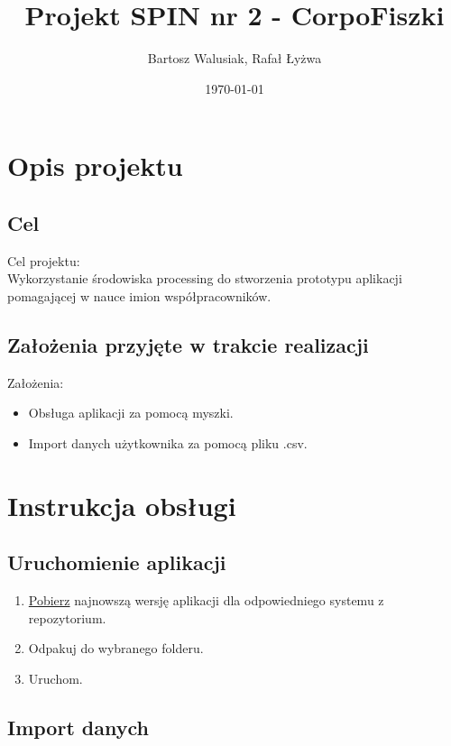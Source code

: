 \documentclass[11pt]{article}
\begin{document}
    \title{Projekt SPIN nr 2 - CorpoFiszki}
    \author{Bartosz Walusiak, Rafał Łyżwa}
    \date{\today}
    \maketitle

    \tableofcontents

    \newpage

    \section{Opis projektu}\label{sec:description}
    \subsection{Cel}\label{subsec:target}
    Cel projektu:\\
    Wykorzystanie środowiska processing do stworzenia prototypu aplikacji pomagającej w nauce imion współpracowników.

    \subsection{Założenia przyjęte w trakcie realizacji}\label{subsec:design-choices}
    Założenia:
    \begin{itemize}
        \item Obsługa aplikacji za pomocą myszki.
        \item Import danych użytkownika za pomocą pliku .csv.
    \end{itemize}

    \newpage

    \section{Instrukcja obsługi}\label{sec:user-manual}

    \subsection{Uruchomienie aplikacji}\label{subsec:setup}

    \begin{enumerate}
        \item \href{https://github.com/BWalusiak/flashcards/releases}{Pobierz} najnowszą wersję aplikacji dla odpowiedniego systemu z repozytorium.
        \item Odpakuj do wybranego folderu.
        \item Uruchom.
    \end{enumerate}

    \subsection{Import danych}\label{subsec:data-import}
\end{document}
